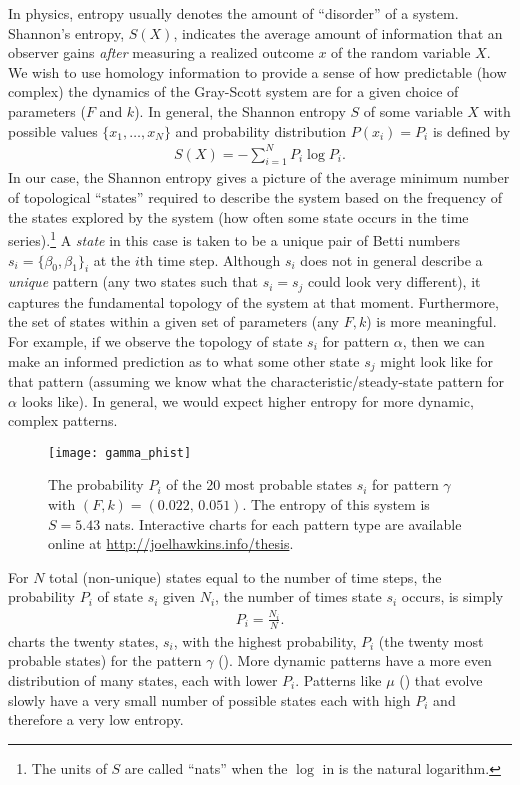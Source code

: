 In physics, entropy usually denotes the amount of ``disorder'' of a system. Shannon's entropy, $S(X)$, indicates the average amount of information that an observer gains \emph{after} measuring a realized outcome $x$ of the random variable $X$. We wish to use homology information to provide a sense of how predictable (how complex) the dynamics of the Gray-Scott system are for a given choice of parameters ($F$ and $k$). In general, the Shannon entropy $S$ of some variable $X$ with possible values $\{ x_1, \ldots, x_N \}$ and probability distribution $P(x_i) = P_i$ is defined by
\begin{align} \label{eq:shannon}
	S(X) = - \sum_{i=1}^{N} P_i \log{ P_i}.
\end{align}
In our case, the Shannon entropy gives a picture of the average minimum number of topological ``states'' required to describe the system based on the frequency of the states explored by the system (\ie how often some state occurs in the time series).\footnote{The units of $S$ are called ``nats'' when the $\log$ in  is the natural logarithm.} A \emph{state} in this case is taken to be a unique pair of Betti numbers $s_i = \{ \beta_0, \beta_1 \}_i$ at the $i$th time step. Although $s_i$ does not in general describe a \emph{unique} pattern (any two states such that $s_i = s_j$ could look very different), it captures the fundamental topology of the system at that moment. Furthermore, the set of states within a given set of parameters (any $F, k$) is more meaningful. For example, if we observe the topology of state $s_i$ for pattern $\alpha$, then we can make an informed prediction as to what some other state $s_j$ might look like for that pattern (assuming we know what the characteristic/steady-state pattern for $\alpha$ looks like). In general, we would expect higher entropy for more dynamic, complex patterns.

\begin{figure}[h]
	\centering
	\texttt{[image: gamma\_phist]}
                \caption{The probability $P_i$ of the 20 most probable states $s_i$ for pattern $\gamma$ with $(F, k) = (0.022,\, 0.051)$. The entropy of this system is $S = 5.43$ nats. Interactive charts for each pattern type are available online at \url{http://joelhawkins.info/thesis}.}
                \label{fig:gamma_phist}
\end{figure}

For $N$ total (non-unique) states equal to the number of time steps, the probability $P_i$ of state $s_i$ given $N_i$, the number of times state $s_i$ occurs, is simply
\begin{align} \label{eq:Pi}
	P_i = \frac{N_i}{N}.
\end{align}
 charts the twenty states, $s_i$, with the highest probability, $P_i$ (\ie the twenty most probable states) for the pattern $\gamma$ (). More dynamic patterns have a more even distribution of many states, each with lower $P_i$. Patterns like $\mu$ () that evolve slowly have a very small number of possible states each with high $P_i$ and therefore a very low entropy.

